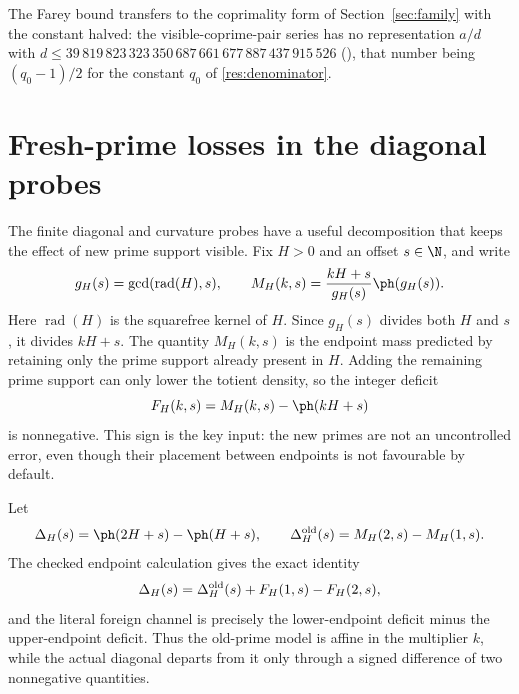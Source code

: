 The Farey bound transfers to the coprimality form of Section~\ref{sec:family} with
the constant halved: the visible-coprime-pair series has no representation
$a/d$ with $d\le39\,819\,823\,323\,350\,687\,661\,677\,887\,437\,915\,526$
(),
that number being $(q_0-1)/2$ for the constant $q_0$ of
\ref{res:denominator}.



\section{Fresh-prime losses in the diagonal probes}\label{sec:fresh-prime}

The finite diagonal and curvature probes have a useful decomposition that
keeps the effect of new prime support visible.  Fix \(H>0\) and an offset
\(s\in\N\), and write
\[
 g_H(s)=\gcd(\operatorname{rad}(H),s),
 \qquad
 M_H(k,s)=\frac{kH+s}{g_H(s)}\ph(g_H(s)).
\]
Here \(\operatorname{rad}(H)\) is the squarefree kernel of \(H\).  Since
\(g_H(s)\) divides both \(H\) and \(s\), it divides \(kH+s\).  The quantity
\(M_H(k,s)\) is the endpoint mass predicted by retaining only the prime
support already present in \(H\).  Adding the remaining prime support can only
lower the totient density, so the integer deficit
\[
 F_H(k,s)=M_H(k,s)-\ph(kH+s)
\]
is nonnegative.  This sign is the key input: the new primes are not an
uncontrolled error, even though their placement between endpoints is not
favourable by default.

Let
\[
 \Delta_H(s)=\ph(2H+s)-\ph(H+s),
 \qquad
 \Delta_H^{\rm old}(s)=M_H(2,s)-M_H(1,s).
\]
The checked endpoint calculation gives the exact identity
\[
 \Delta_H(s)=\Delta_H^{\rm old}(s)+F_H(1,s)-F_H(2,s),
\]
and the literal foreign channel is precisely the lower-endpoint deficit minus
the upper-endpoint deficit.  Thus the old-prime model is affine in the
multiplier \(k\), while the actual diagonal departs from it only through a
signed difference of two nonnegative quantities.

